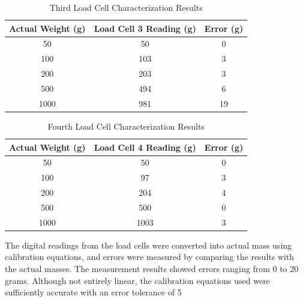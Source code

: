 \begin{enumerate}[label=\Alph*.]
        \begin{table}[h]
            \centering
            \caption{Third Load Cell Characterization Results}
            \begin{tabular}{|c|c|c|}
                \hline
                \textbf{Actual Weight (g)} & \textbf{Load Cell 3 Reading (g)} & \textbf{Error (g)} \\
                \hline
                50        & 50        & 0    \\    
                100       & 103       & 3    \\    
                200       & 203       & 3    \\    
                500       & 494       & 6    \\    
                1000      & 981       & 19   \\               
                \hline
        \end{tabular}
        \label{tab:Calibration_Load_Cell_3}
        \end{table}

        \begin{table}[h]
            \centering
            \caption{Fourth Load Cell Characterization Results}
            \begin{tabular}{|c|c|c|}
                \hline
                \textbf{Actual Weight (g)} & \textbf{Load Cell 4 Reading (g)} & \textbf{Error (g)} \\
                \hline
                50        & 50        & 0   \\     
                100       & 97        & 3   \\     
                200       & 204       & 4   \\     
                500       & 500       & 0   \\     
                1000      & 1003      & 3   \\                
                \hline
        \end{tabular}
        \label{tab:Calibration_Load_Cell_4}
        \end{table}
    
        
        \hspace*{1em} The digital readings from the load cells were converted into actual mass using calibration equations, and errors were measured by comparing the results with the actual masses. The measurement results showed errors ranging from 0 to 20 grams. Although not entirely linear, the calibration equations used were sufficiently accurate with an error tolerance of 5%


\end{enumerate}
